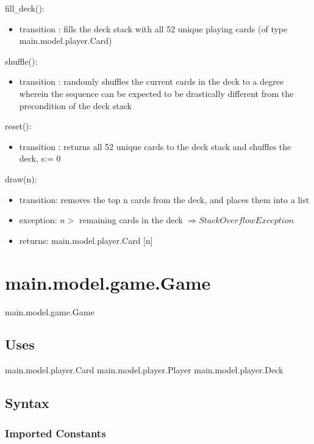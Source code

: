 \documentclass[12pt, titlepage]{article}
\begin{document}
\noindent fill\verb|_|deck():
\begin{itemize}
\item transition : fills the deck stack with all 52 unique playing cards (of type main.model.player.Card)
\end{itemize}

\noindent shuffle():
\begin{itemize}
\item transition : randomly shuffles the current cards in the deck to a degree wherein the sequence can be expected to be drastically different from the precondition of the deck stack 
\end{itemize}

\noindent reset():
\begin{itemize}
\item transition : returns all 52 unique cards to the deck stack and shuffles the deck, s:= 0
\end{itemize}

\noindent draw(n):
\begin{itemize}
\item transition: removes the top n cards from the deck, and places them into a list 
\item exception: $n >$ remaining cards in the deck $\Longrightarrow StackOverflowException$
\item returns: main.model.player.Card [n]
\end{itemize}

\section*{main.model.game.Game}

main.model.game.Game

\subsection* {Uses}

main.model.player.Card
main.model.player.Player
main.model.player.Deck

\subsection* {Syntax}

\subsubsection* {Imported Constants}
\end{document}
